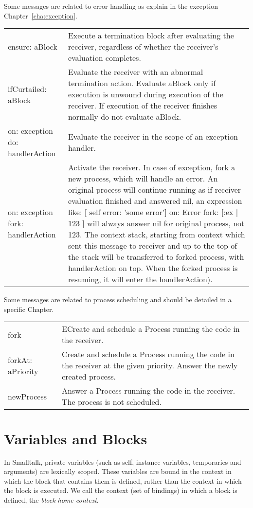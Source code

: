 \documentclass[a4paper,10pt,twoside]{book}
\begin{document}
Some messages are related to error handling as explain in the exception Chapter~\ref{cha:exception}.

\begin{tabular}{p{2cm}|p{8cm}}
\textsf{ensure: aBlock}&Execute a termination block after evaluating the receiver, regardless of whether the receiver's evaluation completes.  \\
\textsf{ifCurtailed: aBlock}& Evaluate the receiver with an abnormal termination action. Evaluate aBlock only if execution is unwound during execution of the receiver. If execution of the receiver finishes normally do not evaluate aBlock. \\
\textsf{on: exception do: handlerAction}&Evaluate the receiver in the scope of an exception handler.\\
\textsf{on: exception fork: handlerAction}&Activate the receiver. In case of exception, fork a new process, which will handle an error.
An original process will continue running as if receiver evaluation finished and answered nil,	\ie  an expression like: \textsf{[ self error: 'some error'] on: Error fork: [:ex |  123 ]} will always answer nil for original process, not 123. The context stack, starting from context which sent this message to receiver and up to the top of the stack will be transferred to forked process, with handlerAction on top. When the forked process is resuming, it will enter the handlerAction).\\
\end{tabular}


Some messages are related to process scheduling and should be detailed in a specific Chapter. 

\begin{tabular}{p{2cm}|p{8cm}}
\textsf{fork}&ECreate and schedule a Process running the code in the receiver.\\
\textsf{forkAt: aPriority}& Create and schedule a Process running the code in the receiver at the given priority. Answer the newly created process. \\
\textsf{newProcess}&Answer a Process running the code in the receiver. The process is not scheduled.\\
\end{tabular}


\section{Variables and Blocks}
In Smalltalk, private variables (such as self, instance variables, temporaries and arguments) are 
lexically scoped. These variables are bound in the context in which the block that contains them is defined, rather than the context in which the block is executed.  We call the context (set of bindings) in which a block is defined, the \emph{block home context}.
\end{document}
